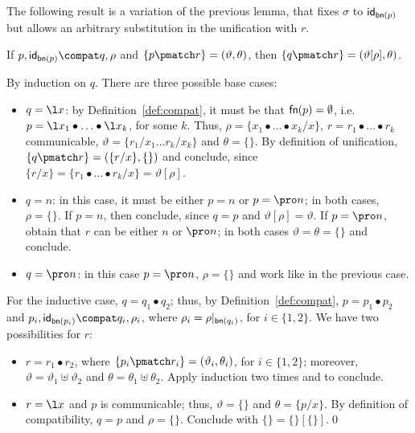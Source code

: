 \documentclass{LMCS}
\begin{document}
The following result is a variation of the previous lemma, that fixes $\sigma$ to ${\sf id}_{{\sf bn}(p)}$ but
allows an arbitrary substitution in the unification with $r$.

\begin{prop}
\label{lem:compat-match}
If $p,{\sf id}_{{\sf bn}(p)} \compat q,\rho$ and $\{p\pmatch r\}=(\vartheta,\theta)$,
then $\{q\pmatch r\}=(\vartheta[\rho],\theta)$.
\end{prop}
\proof
By induction on $q$. There are three possible base cases:
\begin{itemize}
\item $q = \l x$: by Definition~\ref{def:compat}, it must be that ${\sf fn}(p) = \emptyset$, i.e.
$p = \l x_1 \bullet \ldots \bullet \l x_k$, for some $k$. Thus, $\rho = \{x_1 \bullet \ldots \bullet x_k / x\}$,
$r = r_1 \bullet \ldots \bullet r_k$ communicable, $\vartheta = \{r_1/x_1 \ldots r_k/x_k\}$ and $\theta = \{\}$.
By definition of unification, $\{q\pmatch r\}=(\{r/x\},\{\})$ and conclude, since
$\{r/x\} = \{r_1 \bullet \ldots \bullet r_k / x\} = \vartheta[\rho]$.

\item $q = n$: in this case, it must be either $p = n$ or $p = \pro n$; in both cases, $\rho = \{\}$.
If $p = n$, then conclude, since $q = p$ and $\vartheta[\rho] = \vartheta$.
If $p = \pro n$, obtain that $r$ can be either $n$ or $\pro n$; in both cases $\vartheta = \theta = \{\}$
and conclude.

\item $q = \pro n$: in this case $p = \pro n$, $\rho = \{\}$ and work like in the previous case.
\end{itemize}
For the inductive case, $q = q_1 \bullet q_2$; thus, by Definition~\ref{def:compat},
$p = p_1 \bullet p_2$ and $p_i,{\sf id}_{{\sf bn}(p_i)} \compat q_i,\rho_i$, where
$\rho_i = \rho|_{{\sf bn}(q_i)}$, for $i \in \{1,2\}$. We have two possibilities for $r$:
\begin{itemize}
\item $r = r_1 \bullet r_2$, where $\{p_i\pmatch r_i\}=(\vartheta_i,\theta_i)$, for $i \in \{1,2\}$; 
moreover, $\vartheta = \vartheta_1 \uplus \vartheta_2$
and $\theta = \theta_1 \uplus \theta_2$. Apply induction two times and to conclude.

\item $r = \l x$ and $p$ is communicable; thus, $\vartheta = \{\}$ and $\theta = \{p/x\}$.
  By definition of compatibility, $q = p$ and $\rho = \{\}$. Conclude
  with $\{\} = \{\}[\{\}]$.\qed
\end{itemize}
\end{document}
